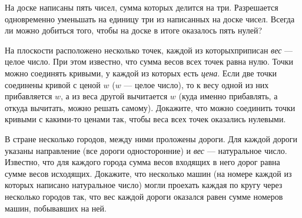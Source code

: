 ﻿
\begin{enumerate}
\itA На доске написаны пять чисел, сумма которых делится на три. Разрешается одновременно уменьшать на единицу три из написанных на доске чисел. Всегда ли можно добиться того, чтобы на доске в итоге оказалось пять нулей?

\itB На плоскости расположено несколько точек, каждой из которых\linebreak приписан {\itshape вес} — целое число. При этом известно, что сумма весов всех точек равна нулю. Точки можно соединять кривыми, у каждой из которых есть {\itshape цена}. Если две точки соединены кривой с ценой $w$ ($w$ — целое число), то к весу одной из них прибавляется $w$, а из веса другой вычитается $w$ (куда именно прибавлять, а откуда вычитать, можно решать самому). Докажите, что можно соединить точки кривыми с какими-то ценами так, чтобы веса всех точек оказались нулевыми.

\itC В стране несколько городов, между ними проложены дороги. Для каждой дороги указаны направление (все дороги односторонние) и {\itshape вес} — натуральное число. Известно, что для каждого города сумма весов входящих в него дорог равна сумме весов исходящих. Докажите, что несколько машин (на номере каждой из которых написано натуральное число) могли проехать каждая по кругу через несколько городов так, что вес каждой дороги оказался равен сумме номеров машин, побывавших на ней.
\end{enumerate}